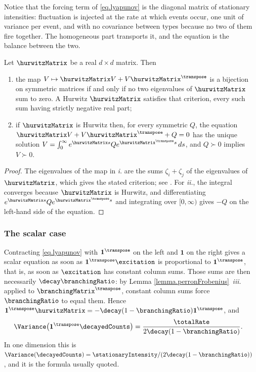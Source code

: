 \begin{remark}
 Notice that the forcing term of \eqref{eq.lyapunov} is the diagonal matrix of stationary
 intensities:
 fluctuation is injected at the rate at which events occur,
 one unit of variance per event,
 and with no covariance between types because no two of them fire together.
 The homogeneous part transports it,
 and the equation is the balance between the two.
\end{remark}

\begin{lemma}\label{lemma.lyapunovUniqueness}
 Let $\hurwitzMatrix$ be a real $d \times d$ matrix.
 Then
 \begin{enumerate}[label={\emph{\roman{*}}.}]
  \item the map $V \mapsto \hurwitzMatrix V + V\hurwitzMatrix^{\transpose}$ is a bijection
        on symmetric matrices if and only if no two eigenvalues of $\hurwitzMatrix$ sum to
        zero. A Hurwitz $\hurwitzMatrix$ satisfies that criterion, every such sum
        having strictly negative real part;
  \item if $\hurwitzMatrix$ is Hurwitz then, for every symmetric $Q$, the equation
        $\hurwitzMatrix V + V\hurwitzMatrix^{\transpose} + Q = 0$ has the unique solution
        $V = \int_{0}^{\infty} e^{\hurwitzMatrix s} Q e^{\hurwitzMatrix^{\transpose} s}
        \, ds$, and $Q \succ 0$ implies $V \succ 0$.
 \end{enumerate}
\end{lemma}
\begin{proof}
 The eigenvalues of the map in \emph{i.} are the sums $\zeta_i + \zeta_j$ of the
 eigenvalues of $\hurwitzMatrix$, which gives the stated criterion;
 see \cite[Theorem 2.4.4.1]{HJ13mat}.
 For \emph{ii.}, the integral converges because $\hurwitzMatrix$ is Hurwitz,
 and differentiating $e^{\hurwitzMatrix s}Qe^{\hurwitzMatrix^{\transpose}s}$ and
 integrating over $[0,\infty)$ gives $-Q$ on the left-hand side of the equation.
\end{proof}

\subsubsection{The scalar case}

Contracting \eqref{eq.lyapunov} with $\mathbf{1}^{\transpose}$ on the left and
$\mathbf{1}$ on the right gives a scalar equation as soon as
$\mathbf{1}^{\transpose}\excitation$ is proportional to $\mathbf{1}^{\transpose}$,
that is, as soon as $\excitation$ has constant column sums.
Those sums are then necessarily $\decay\branchingRatio$:
by Lemma \ref{lemma.perronFrobenius}~\emph{iii.} applied to $\branchingMatrix^{\transpose}$,
constant column sums force $\branchingRatio$ to equal them.
Hence
$\mathbf{1}^{\transpose}\hurwitzMatrix
= -\decay(1-\branchingRatio)\mathbf{1}^{\transpose}$, and
\begin{equation}\label{eq.scalarVariance}
 \Variance \big( \mathbf{1}^{\transpose}\decayedCounts \big)
 = \frac{\totalRate}{2\decay(1-\branchingRatio)} .
\end{equation}
In one dimension this is
$\Variance(\decayedCounts) = \stationaryIntensity/(2\decay(1-\branchingRatio))$,
and it is the formula usually quoted.


